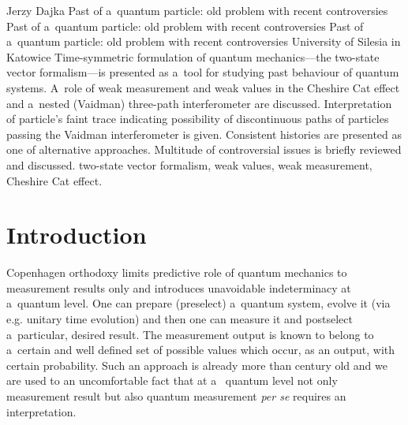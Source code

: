 \begin{artengenv}{Jerzy Dajka}
	{Past of a~quantum particle: old problem with recent controversies}
	{Past of a~quantum particle: old problem with recent controversies}
	{Past of a~quantum particle: old problem with recent controversies}
	{University of Silesia in Katowice}
	{Time-symmetric formulation of quantum mechanics---the two-state vector formalism---is presented  as a~tool for studying past behaviour of quantum systems. A~role of weak measurement and weak values in the Cheshire Cat effect and a~nested (Vaidman) three-path interferometer are discussed. Interpretation of particle's faint trace indicating possibility of discontinuous  paths of particles passing  the Vaidman interferometer is given.   Consistent histories are presented as one of  alternative approaches.  Multitude of controversial issues is briefly reviewed and discussed. }
	{two-state vector formalism, weak values, weak measurement, Cheshire Cat effect.}



\section{Introduction}
\lettrine[loversize=0.13,lines=2,lraise=-0.01,nindent=0em,findent=0.2pt]%
{C}{}openhagen orthodoxy limits predictive role of quantum mechanics to measurement results only and introduces unavoidable indeterminacy at a~quantum level. One can prepare (preselect) a~quantum system, evolve it (via e.g. unitary time evolution) and then one can measure it and postselect a~particular, desired result. The measurement output is known to belong to a~certain and well defined set of possible values which occur, as an output, with certain probability. Such an approach is already more than century old and we are used to an uncomfortable fact that at a~ quantum level not only measurement result but also quantum measurement {\it per se} requires an interpretation. 


\end{artengenv}
